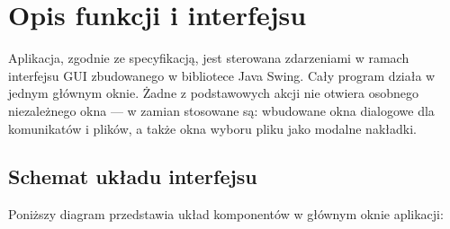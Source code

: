 \documentclass[a4paper, 11pt]{article}
\begin{document}
\section{Opis funkcji i interfejsu}

Aplikacja, zgodnie ze specyfikacj\k{a}, jest sterowana zdarzeniami w ramach interfejsu GUI zbudowanego w bibliotece Java Swing. Ca\l{}y program dzia\l{}a w jednym g\l{}\'{o}wnym oknie. \.Zadne z podstawowych akcji nie otwiera osobnego niezale\.znego okna --- w zamian stosowane s\k{a}: wbudowane okna dialogowe dla komunikat\'ow i plik\'ow, a tak\.ze okna wyboru pliku jako modalne nakładki.

\subsection{Schemat uk\l{}adu interfejsu}

Poni\.zszy diagram przedstawia uk\l{}ad komponent\'ow w g\l{}\'{o}wnym oknie aplikacji:
\end{document}
